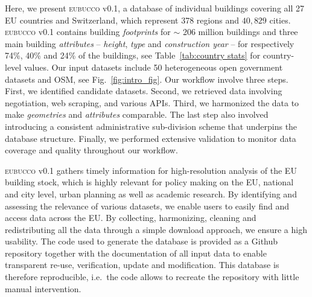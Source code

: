 \documentclass[fleqn,10pt]{wlscirep}
\begin{document}
Here, we present \textsc{eubucco} v0.1, a database of individual buildings covering all 27 EU countries and Switzerland, which represent 378 regions and $40,829$ cities. \textsc{eubucco} v0.1 contains building \textit{footprints} for  $\sim$ 206 million buildings and three main building \textit{attributes} --  \textit{height}, \textit{type} and \textit{construction year} -- for respectively 74\%, 40\% and 24\% of the buildings, see Table~\ref{tab:country stats} for country-level values.
Our input datasets include 50 heterogeneous open government datasets and OSM, see Fig.~\ref{fig:intro_fig}. 
Our workflow involve three steps. First, we identified candidate datasets. Second, we retrieved data involving negotiation, web scraping, and various APIs. Third, we harmonized the data to make \textit{geometries} and \textit{attributes} comparable. The last step also involved introducing a consistent administrative sub-division scheme that underpins the database structure.
Finally, we performed extensive validation to monitor data coverage and quality throughout our workflow.

\textsc{eubucco} v0.1 gathers timely information for high-resolution analysis of the EU building stock, which is highly relevant for policy making on the EU, national and city level, urban planning as well as academic research. By identifying and assessing the relevance of various datasets, we enable users to easily find and access data across the EU. By collecting, harmonizing, cleaning and redistributing all the data through a simple download approach, we ensure a high usability. The code used to generate the database is provided as a Github repository\cite{eubucco-0.1-code2022} together with the documentation of all input data to enable transparent re-use, verification, update and modification. This database is therefore reproducible, i.e.\ the code allows to recreate the repository with little manual intervention.
\end{document}
